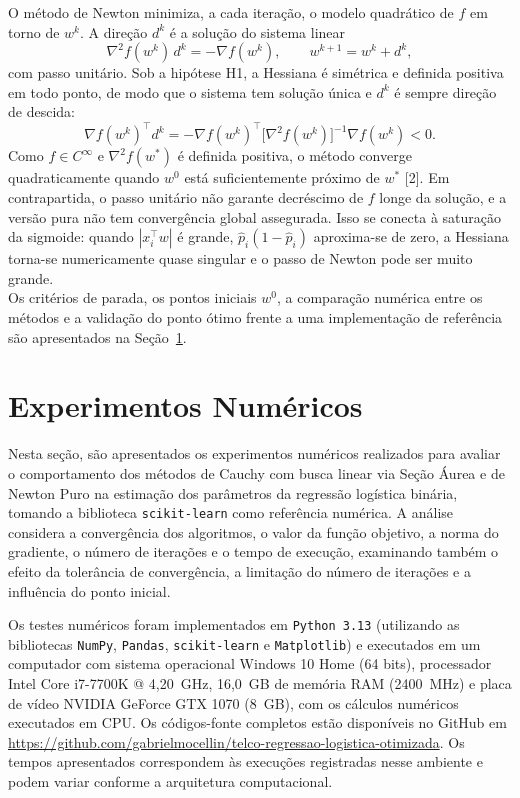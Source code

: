 \documentclass{article}
\theoremstyle{remark}
\begin{document}
O método de Newton minimiza, a cada iteração, o modelo quadrático de $f$ em torno de $w^k$. A direção $d^k$ é a solução do sistema linear
\[
\nabla^2 f(w^k)\, d^k = -\nabla f(w^k), \qquad w^{k+1} = w^k + d^k,
\]
com passo unitário. Sob a hipótese H1, a Hessiana é simétrica e definida positiva em todo ponto, de modo que o sistema tem solução única e $d^k$ é sempre direção de descida:
\[
\nabla f(w^k)^\top d^k = -\nabla f(w^k)^\top \big[ \nabla^2 f(w^k) \big]^{-1} \nabla f(w^k) < 0.
\]
Como $f \in C^\infty$ e $\nabla^2 f(w^*)$ é definida positiva, o método converge quadraticamente quando $w^0$ está suficientemente próximo de $w^*$ [2]. Em contrapartida, o passo unitário não garante decréscimo de $f$ longe da solução, e a versão pura não tem convergência global assegurada. Isso se conecta à saturação da sigmoide: quando $|x_i^\top w|$ é grande, $\hat p_i(1 - \hat p_i)$ aproxima-se de zero, a Hessiana torna-se numericamente quase singular e o passo de Newton pode ser muito grande. \\

Os critérios de parada, os pontos iniciais $w^0$, a comparação numérica entre os métodos e a validação do ponto ótimo frente a uma implementação de referência são apresentados na Seção~\ref{sec:experimentos}.

\section{Experimentos Numéricos}\label{sec:experimentos}

Nesta seção, são apresentados os experimentos numéricos realizados para avaliar o comportamento dos métodos de Cauchy com busca linear via Seção Áurea e de Newton Puro na estimação dos parâmetros da regressão logística binária, tomando a biblioteca \texttt{scikit-learn} como referência numérica. A análise considera a convergência dos algoritmos, o valor da função objetivo, a norma do gradiente, o número de iterações e o tempo de execução, examinando também o efeito da tolerância de convergência, a limitação do número de iterações e a influência do ponto inicial.

Os testes numéricos foram implementados em \texttt{Python 3.13} (utilizando as bibliotecas \texttt{NumPy}, \texttt{Pandas}, \texttt{scikit-learn} e \texttt{Matplotlib}) e executados em um computador com sistema operacional Windows 10 Home (64 bits), processador Intel Core i7-7700K @ 4,20~GHz, 16,0~GB de memória RAM (2400~MHz) e placa de vídeo NVIDIA GeForce GTX 1070 (8~GB), com os cálculos numéricos executados em CPU. Os códigos-fonte completos estão disponíveis no GitHub em \url{https://github.com/gabrielmocellin/telco-regressao-logistica-otimizada}. Os tempos apresentados correspondem às execuções registradas nesse ambiente e podem variar conforme a arquitetura computacional.
\end{document}
